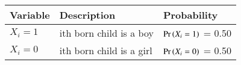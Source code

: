\begin{tabular}{|l|l|l|}\hline
Variable        &Description                    &Probability\\\hline
$X_i = 1$	&ith born child is a boy	&$\Pr\left(X_i = 1\right)$ = 0.50\\\hline
$X_i = 0$	&ith born child is a girl	&$\Pr\left(X_i = 0\right)$ = 0.50\\\hline
\end{tabular}
